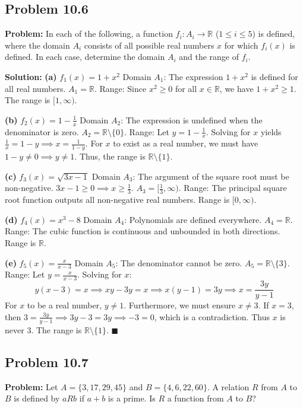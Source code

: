 \documentclass[11pt, a4paper]{article}
\theoremstyle{definition}
\theoremstyle{remark}
\newcommand{\R}{\mathbb{R}}
\begin{document}
\subsection{Problem 10.6}
\textbf{Problem:} In each of the following, a function $f_i : A_i \to \R$ ($1 \le i \le 5$) is defined, where the domain $A_i$ consists of all possible real numbers $x$ for which $f_i(x)$ is defined. In each case, determine the domain $A_i$ and the range of $f_i$.

\textbf{Solution:}
\textbf{(a)} $f_1(x) = 1 + x^2$
Domain $A_1$: The expression $1 + x^2$ is defined for all real numbers. $A_1 = \R$.
Range: Since $x^2 \ge 0$ for all $x \in \R$, we have $1 + x^2 \ge 1$. The range is $[1, \infty)$.

\textbf{(b)} $f_2(x) = 1 - \frac{1}{x}$
Domain $A_2$: The expression is undefined when the denominator is zero. $A_2 = \R \setminus \{0\}$.
Range: Let $y = 1 - \frac{1}{x}$. Solving for $x$ yields $\frac{1}{x} = 1 - y \implies x = \frac{1}{1 - y}$. For $x$ to exist as a real number, we must have $1 - y \neq 0 \implies y \neq 1$. Thus, the range is $\R \setminus \{1\}$.

\textbf{(c)} $f_3(x) = \sqrt{3x - 1}$
Domain $A_3$: The argument of the square root must be non-negative. $3x - 1 \ge 0 \implies x \ge \frac{1}{3}$. $A_3 = [\frac{1}{3}, \infty)$.
Range: The principal square root function outputs all non-negative real numbers. Range is $[0, \infty)$.

\textbf{(d)} $f_4(x) = x^3 - 8$
Domain $A_4$: Polynomials are defined everywhere. $A_4 = \R$.
Range: The cubic function is continuous and unbounded in both directions. Range is $\R$.

\textbf{(e)} $f_5(x) = \frac{x}{x-3}$
Domain $A_5$: The denominator cannot be zero. $A_5 = \R \setminus \{3\}$.
Range: Let $y = \frac{x}{x-3}$. Solving for $x$:
\[ y(x-3) = x \implies xy - 3y = x \implies x(y-1) = 3y \implies x = \frac{3y}{y-1} \]
For $x$ to be a real number, $y \neq 1$. Furthermore, we must ensure $x \neq 3$. If $x = 3$, then $3 = \frac{3y}{y-1} \implies 3y - 3 = 3y \implies -3 = 0$, which is a contradiction. Thus $x$ is never $3$. The range is $\R \setminus \{1\}$.
$\blacksquare$

\subsection{Problem 10.7}
\textbf{Problem:} Let $A = \{3, 17, 29, 45\}$ and $B = \{4, 6, 22, 60\}$. A relation $R$ from $A$ to $B$ is defined by $a R b$ if $a + b$ is a prime. Is $R$ a function from $A$ to $B$?
\end{document}
